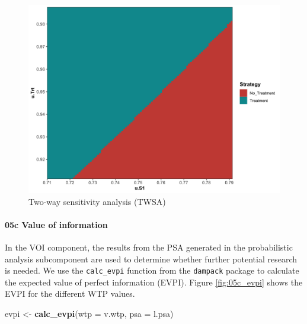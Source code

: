 \documentclass[]{article}
\newenvironment{Shaded}{\begin{snugshade}}{\end{snugshade}}
\newcommand{\KeywordTok}[1]{\textcolor[rgb]{0.13,0.29,0.53}{\textbf{#1}}}
\newcommand{\DataTypeTok}[1]{\textcolor[rgb]{0.13,0.29,0.53}{#1}}
\newcommand{\StringTok}[1]{\textcolor[rgb]{0.31,0.60,0.02}{#1}}
\newcommand{\NormalTok}[1]{#1}
\let\oldparagraph\paragraph
\renewcommand{\paragraph}[1]{\oldparagraph{#1}\mbox{}}
\begin{document}
\begin{figure}
\centering
\includegraphics{../figs/05b_twsa-lrm-uS1-uTrt-nmb.png}
\caption{Two-way sensitivity analysis (TWSA)
\label{fig:05b_twsa-lrm-uS1-uTrt-nmb}}
\end{figure}

\paragraph{05c Value of information}\label{c-value-of-information}

In the VOI component, the results from the PSA generated in the
probabilistic analysis subcomponent are used to determine whether
further potential research is needed. We use the \texttt{calc\_evpi}
function from the \texttt{dampack} package to calculate the expected
value of perfect information (EVPI). Figure \ref{fig:05c_evpi} shows the
EVPI for the different WTP values.

\begin{Shaded}
\begin{Highlighting}[]
\NormalTok{evpi <-}\StringTok{ }\KeywordTok{calc_evpi}\NormalTok{(}\DataTypeTok{wtp =}\NormalTok{ v.wtp, }\DataTypeTok{psa =}\NormalTok{ l.psa)}
\end{Highlighting}
\end{Shaded}
\end{document}
